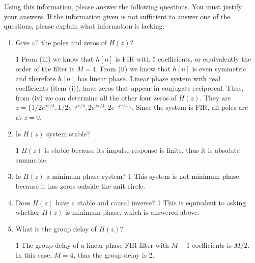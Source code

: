 \documentclass[10pt]{article}
\def\SOLUTIONS{0} %
\def\SolutionsColor{red2}
\begin{document}
\begin{description}
Using this information, please answer the following questions. You must justify your answers. If the information given is not sufficient to answer one of the questions, please explain what information is lacking. 

\begin{enumerate}	
	\item Give all the poles and zeros of $H(z)$?
	
	\if\SOLUTIONS1
	{\color{\SolutionsColor} 
		From (iii) we know that $h[n]$ is FIR with 5 coefficients, or equivalently the order of the filter is $M = 4$. From (ii) we know that $h[n]$ is even symmetric and therefore $h[n]$ has linear phase. Linear phase system with real coefficients (item (i)), have zeros that appear in conjugate reciprocal. Thus, from (iv) we can determine all the other four zeros of $H(z)$. They are $z = \{1/2e^{j\pi/4}, 1/2e^{-j\pi/4}, 2e^{j\pi/4}, 2e^{-j\pi/4}\}$. Since the system is FIR, all poles are at $z = 0$.
	}
	\else\vspace{4cm}
	\fi
	
	\item Is $H(z)$ system stable?
	
	\if\SOLUTIONS1
	{\color{\SolutionsColor} 
		$H(z)$ is stable because its impulse response is finite, thus it is absolute summable.
	}
	\else\vspace{2cm}
	\fi
	
	\item Is $H(z)$ a minimum phase system?
		\if\SOLUTIONS1
	{\color{\SolutionsColor} 
		This system is not minimum phase because it has zeros outside the unit circle.
	}
	\else\vspace{2cm}
	\fi
	
	\item Does $H(z)$ have a stable and causal inverse?
	\if\SOLUTIONS1
	{\color{\SolutionsColor} 
		This is equivalent to asking whether $H(z)$ is minimum phase, which is answered above.
	}
	\else\vspace{2cm}
	\fi
	
	\item What is the group delay of $H(z)$?
	
	\if\SOLUTIONS1
	{\color{\SolutionsColor} 
		The group delay of a linear phase FIR filter with $M+1$ coefficients is $M/2$. In this case, $M = 4$, thus the group delay is 2.
	}
	\else\vspace{1cm}
	\fi
\end{enumerate}

\end{description}
\newpage
\end{document}
